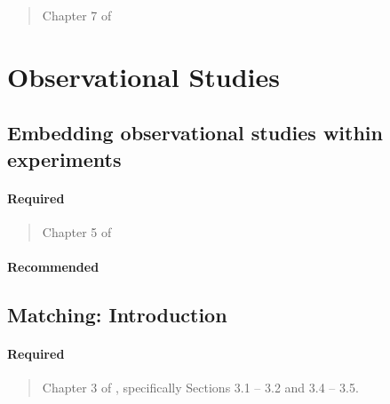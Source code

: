 \documentclass[12pt]{article}
\begin{document}
\begin{verse} Chapter 7 of  \end{verse}

\begin{verse}  \end{verse}

\begin{verse}  \end{verse}

\section{Observational Studies}

\subsection{Embedding observational studies within experiments}

\paragraph*{Required}

\begin{verse} Chapter 5 of  \end{verse}

\paragraph*{Recommended}

\begin{verse}  \end{verse}

\begin{verse}  \end{verse}

\subsection{Matching: Introduction}

\paragraph*{Required}

\begin{verse}
  Chapter 3 of , specifically Sections 3.1 -- 3.2 and 3.4 -- 3.5.
\end{verse}
\end{document}
